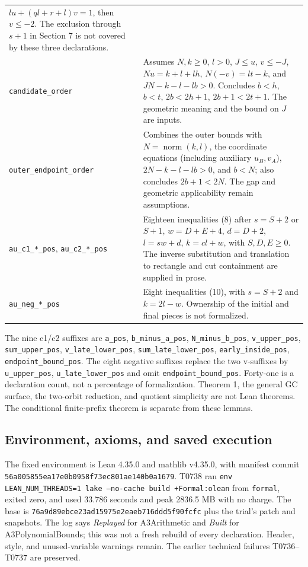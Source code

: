 \documentclass[11pt]{amsart}
\newcommand{\record}[1]{\nolinkurl{#1}}
\begin{document}
\begin{longtable}{>{\raggedright\arraybackslash}p{}>{\raggedright\arraybackslash}p{}}
$lu+(ql+r+l)v=1$, then $v\le-2$. The exclusion through $s+1$ in
Section 7 is not covered by these three declarations.\\
\record{candidate_order} & Assumes $N,k\ge0$, $l>0$, $J\le u$,
$v\le-J$, $Nu=k+l+lh$, $N(-v)=lt-k$, and
$JN-k-l-lb>0$. Concludes $b<h$, $b<t$, $2b<2h+1$,
$2b+1<2t+1$. The geometric meaning and the bound on $J$ are inputs.\\
\record{outer_endpoint_order} & Combines the outer bounds with
$N=\operatorname{norm}(k,l)$, the coordinate equations (including
auxiliary $u_B,v_A$), $2N-k-l-lb>0$, and $b<N$; also concludes
$2b+1<2N$. The gap and geometric applicability remain assumptions.\\
\record{au_c1_*_pos}, \record{au_c2_*_pos} & Eighteen inequalities (8)
after $s=S+2$ or $S+1$, $w=D+E+4$, $d=D+2$, $l=sw+d$,
$k=cl+w$, with $S,D,E\ge0$. The inverse substitution and translation
to rectangle and cut containment are supplied in prose.\\
\record{au_neg_*_pos} & Eight inequalities (10), with $s=S+2$ and
$k=2l-w$. Ownership of the initial and final pieces is not formalized.\\
\bottomrule
\end{longtable}
The nine c1/c2 suffixes are
\record{a_pos}, \record{b_minus_a_pos}, \record{N_minus_b_pos},
\record{v_upper_pos}, \record{sum_upper_pos}, \record{v_late_lower_pos},
\record{sum_late_lower_pos}, \record{early_inside_pos},
\record{endpoint_bound_pos}. The eight negative suffixes replace the
two v-suffixes by \record{u_upper_pos}, \record{u_late_lower_pos} and
omit \record{endpoint_bound_pos}. Forty-one is a declaration count,
not a percentage of formalization. Theorem 1, the general GC surface, the
two-orbit reduction, and quotient simplicity are not Lean theorems.
The conditional finite-prefix theorem is separate from these lemmas.

\subsection{Environment, axioms, and saved execution}
The fixed environment is Lean 4.35.0 and mathlib v4.35.0, with manifest
commit \record{56a005855ea17e0b0958f73ec801ae140b0a1679}.
T0738 ran \texttt{env LEAN\_NUM\_THREADS=1 lake --no-cache build +Formal:olean}
from \record{formal}, exited zero, and used 33.786 seconds and peak
2836.5 MB with no charge. The base is
\record{76a9d89ebce23ad15975e2eaeb716ddd5f90fcfc} plus the trial's patch
and snapshots. The log says \emph{Replayed} for A3Arithmetic and
\emph{Built} for A3PolynomialBounds; this was not a fresh rebuild of
every declaration. Header, style, and unused-variable warnings remain.
The earlier technical failures T0736--T0737 are preserved.
\end{document}
